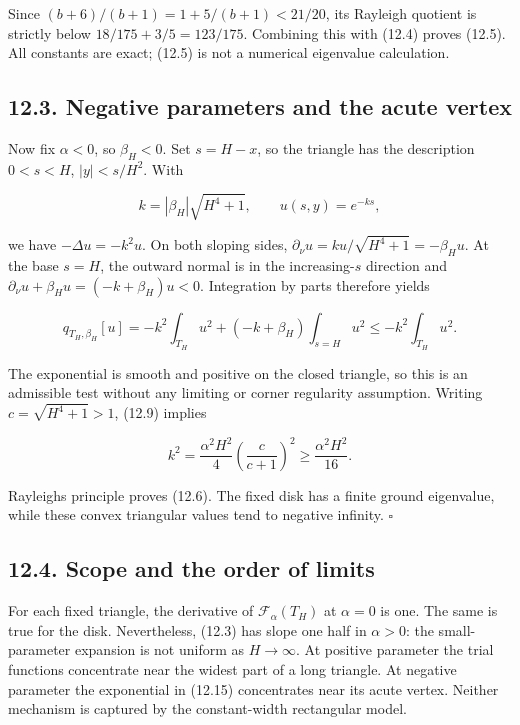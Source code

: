 \documentclass[11pt]{article}
\begin{document}
Since \((b+6)/(b+1)=1+5/(b+1)<21/20\), its Rayleigh quotient is strictly
below \(18/175+3/5=123/175\). Combining this with (12.4) proves (12.5).
All constants are exact; (12.5) is not a numerical eigenvalue
calculation.

\subsection{12.3. Negative parameters and the acute
vertex}\label{negative-parameters-and-the-acute-vertex}

Now fix \(\alpha<0\), so \(\beta_H<0\). Set \(s=H-x\), so the triangle
has the description \(0<s<H\), \(|y|<s/H^2\). With

\[
k=|\beta_H|\sqrt{H^4+1},\qquad u(s,y)=e^{-ks},
\tag{12.15}
\]

we have \(-\Delta u=-k^2u\). On both sloping sides,
\(\partial_\nu u=k u/\sqrt{H^4+1}=-\beta_Hu\). At the base \(s=H\), the
outward normal is in the increasing-\(s\) direction and
\(\partial_\nu u+\beta_Hu=(-k+\beta_H)u<0\). Integration by parts
therefore yields

\[
q_{T_H,\beta_H}[u]
=-k^2\int_{T_H}u^2
+(-k+\beta_H)\int_{s=H}u^2
\le-k^2\int_{T_H}u^2.
\tag{12.16}
\]

The exponential is smooth and positive on the closed triangle, so this
is an admissible test without any limiting or corner regularity
assumption. Writing \(c=\sqrt{H^4+1}>1\), (12.9) implies

\[
k^2=\frac{\alpha^2H^2}{4}\left(\frac c{c+1}\right)^2
\ge\frac{\alpha^2H^2}{16}.
\tag{12.17}
\]

Rayleigh\textquotesingle s principle proves (12.6). The fixed disk has a
finite ground eigenvalue, while these convex triangular values tend to
negative infinity. \(\square\)

\subsection{12.4. Scope and the order of
limits}\label{scope-and-the-order-of-limits}

For each fixed triangle, the derivative of \(\mathcal F_\alpha(T_H)\) at
\(\alpha=0\) is one. The same is true for the disk. Nevertheless, (12.3)
has slope one half in \(\alpha>0\): the small-parameter expansion is not
uniform as \(H\to\infty\). At positive parameter the trial functions
concentrate near the widest part of a long triangle. At negative
parameter the exponential in (12.15) concentrates near its acute vertex.
Neither mechanism is captured by the constant-width rectangular model.
\end{document}
